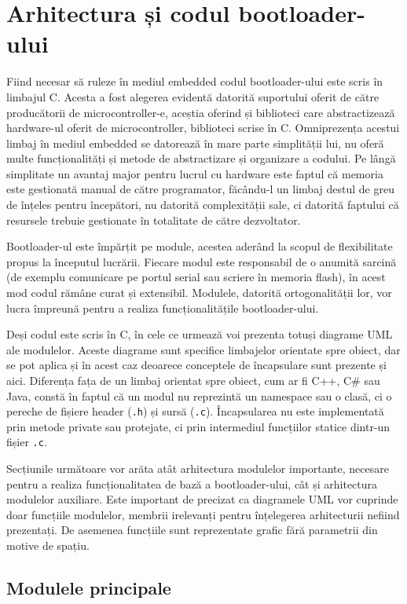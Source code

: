 \documentclass[12pt,a4paper,titlepage]{report}
\begin{document}
\section{Arhitectura și codul bootloader-ului}
Fiind necesar să ruleze în mediul embedded codul bootloader-ului este scris în limbajul C. Acesta a fost alegerea evidentă datorită suportului oferit de către producătorii de microcontroller-e, aceștia oferind și biblioteci care abstractizează hardware-ul oferit de microcontroller, biblioteci scrise în C. Omniprezența acestui limbaj în mediul embedded se datorează în mare parte simplității lui, nu oferă multe funcționalități și metode de abstractizare și organizare a codului. Pe lângă simplitate un avantaj major pentru lucrul cu hardware este faptul că memoria este gestionată manual de către programator, făcându-l un limbaj destul de greu de înțeles pentru începători, nu datorită complexității sale, ci datorită faptului că resursele trebuie gestionate în totalitate de către dezvoltator. 

Bootloader-ul este împărțit pe module, acestea aderând la scopul de flexibilitate propus la începutul lucrării. Fiecare modul este responsabil de o anumită sarcină (de exemplu comunicare pe portul serial sau scriere în memoria flash), în acest mod codul rămâne curat și extensibil. Modulele, datorită ortogonalității lor, vor lucra împreună pentru a realiza funcționalitățile bootloader-ului.

Deși codul este scris în C, în cele ce urmează voi prezenta totuși diagrame UML ale modulelor. Aceste diagrame sunt specifice limbajelor orientate spre obiect, dar se pot aplica și în acest caz deoarece conceptele de încapsulare sunt prezente și aici. Diferența fața de un limbaj orientat spre obiect, cum ar fi C++, C\# sau Java, constă în faptul că un modul nu reprezintă un namespace sau o clasă, ci o pereche de fișiere header (\texttt{.h}) și sursă (\texttt{.c}). Încapsularea nu este implementată prin metode private sau protejate, ci prin intermediul funcțiilor statice dintr-un fișier \texttt{.c}.

Secțiunile următoare vor arăta atât arhitectura modulelor importante, necesare pentru a realiza funcționalitatea de bază a bootloader-ului, cât și arhitectura modulelor auxiliare.
Este important de precizat ca diagramele UML vor cuprinde doar funcțiile modulelor, membrii irelevanți pentru înțelegerea arhitecturii nefiind prezentați. De asemenea funcțiile sunt reprezentate grafic fără parametrii din motive de spațiu.

\subsection{Modulele principale}
\end{document}
